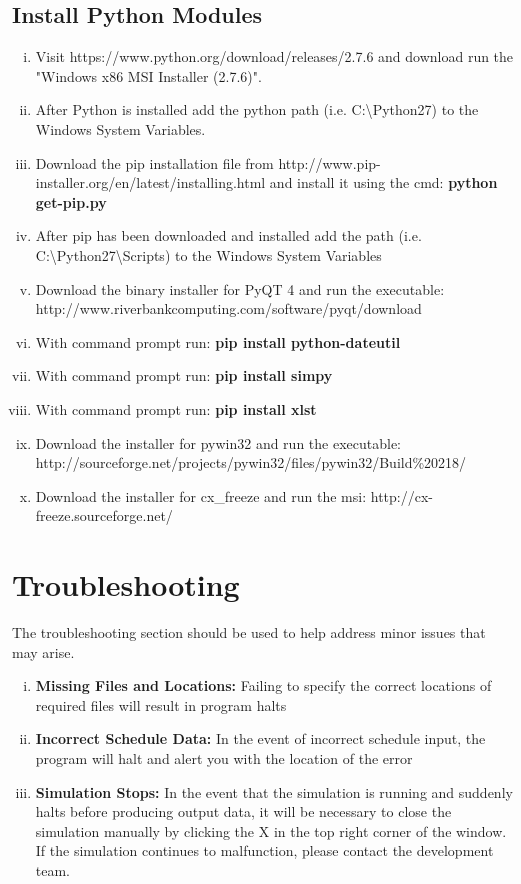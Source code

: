 \documentclass[paper=letter, fontsize=10pt]{scrartcl}
\numberwithin{equation}{section}		%
\numberwithin{figure}{section}			%
\numberwithin{table}{section}				%
\begin{document}
\subsection{Install Python Modules}
\begin{enumerate}[(i)]
	\item Visit https://www.python.org/download/releases/2.7.6 and download run the "Windows x86 MSI Installer (2.7.6)".
	\item After Python is installed add the python path (i.e. C:\textbackslash{Python27}) to the Windows System Variables.
	\item Download the pip installation file from http://www.pip-installer.org/en/latest/installing.html and install it using the cmd: \textbf{python get-pip.py}
	\item After pip has been downloaded and installed add the path (i.e. C:\textbackslash{Python27}\textbackslash{Scripts}) to the Windows System Variables
	\item Download the binary installer for PyQT 4 and run the executable: http://www.riverbankcomputing.com/software/pyqt/download
	\item With command prompt run: \textbf{pip install python-dateutil}
	\item With command prompt run: \textbf{pip install simpy}
	\item With command prompt run: \textbf{pip install xlst}
	\item Download the installer for pywin32 and run the executable: http://sourceforge.net/projects/pywin32/files/pywin32/Build\%20218/
	\item Download the installer for cx\_freeze and run the msi: http://cx-freeze.sourceforge.net/
\end{enumerate}

\section{Troubleshooting}
The troubleshooting section should be used to help address minor issues that may arise.

\begin{enumerate}[(i)]
	\item \textbf{Missing Files and Locations:} Failing to specify the correct locations of required files will result in program halts
	\item \textbf{Incorrect Schedule Data:} In the event of incorrect schedule input, the program will halt and alert you with the location of the error
	\item \textbf{Simulation Stops:} In the event that the simulation is running and suddenly halts before producing output data, it will be necessary to close the simulation manually by clicking the X in the top right corner of the window. If the simulation continues to malfunction, please contact the development team.
\end{enumerate}
\end{document}
